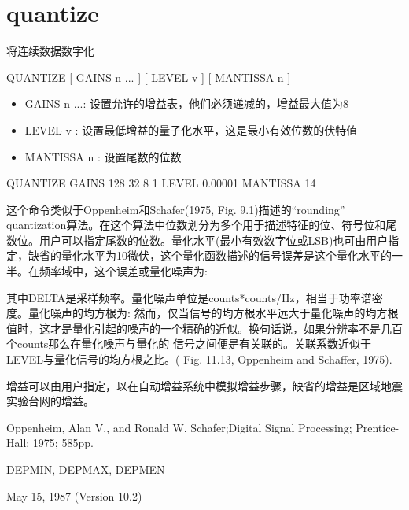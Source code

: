 \section{quantize}
\label{cmd:quantize}

将连续数据数字化

QUANTIZE [ GAINS n ... ] [ LEVEL v ] [ MANTISSA n ]

\begin{itemize}
\item GAINS n ...: 设置允许的增益表，他们必须递减的，增益最大值为8 
\item LEVEL v :  设置最低增益的量子化水平，这是最小有效位数的伏特值 
\item MANTISSA n : 设置尾数的位数 
\end{itemize}

QUANTIZE GAINS 128 32 8 1 LEVEL 0.00001 MANTISSA 14

这个命令类似于Oppenheim和Schafer(1975, Fig. 9.1)描述的``rounding'' quantization算法。在这个算法中位数划分为多个用于描述特征的位、符号位和尾数位。用户可以指定尾数的位数。量化水平(最小有效数字位或LSB)也可由用户指定，缺省的量化水平为10微伏，这个量化函数描述的信号误差是这个量化水平的一半。在频率域中，这个误差或量化噪声为:

其中DELTA是采样频率。量化噪声单位是counts*counts/Hz，相当于功率谱密度。量化噪声的均方根为:
然而，仅当信号的均方根水平远大于量化噪声的均方根值时，这才是量化引起的噪声的一个精确的近似。换句话说，如果分辨率不是几百个counts那么在量化噪声与量化的	信号之间便是有关联的。关联系数近似于LEVEL与量化信号的均方根之比。( Fig. 11.13, 	Oppenheim and Schaffer, 1975).

增益可以由用户指定，以在自动增益系统中模拟增益步骤，缺省的增益是区域地震实验台网的增益。

Oppenheim, Alan V., and Ronald W. Schafer;Digital Signal Processing; Prentice-Hall; 1975; 585pp.

DEPMIN, DEPMAX, DEPMEN

May 15, 1987 (Version 10.2)
